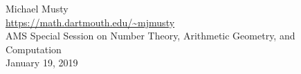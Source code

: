 \documentclass[handout, xcolor=dvipsnames]{beamer}
\theoremstyle{plain}
\begin{document}
\begin{frame}[plain]
\begin{center}
    \end{center}
    \begin{center}
      Michael Musty\\
      \url{https://math.dartmouth.edu/~mjmusty}\\
      AMS Special Session on Number Theory, Arithmetic Geometry, and Computation\\
      January 19, 2019
    \end{center}
  \end{frame}
\end{document}
